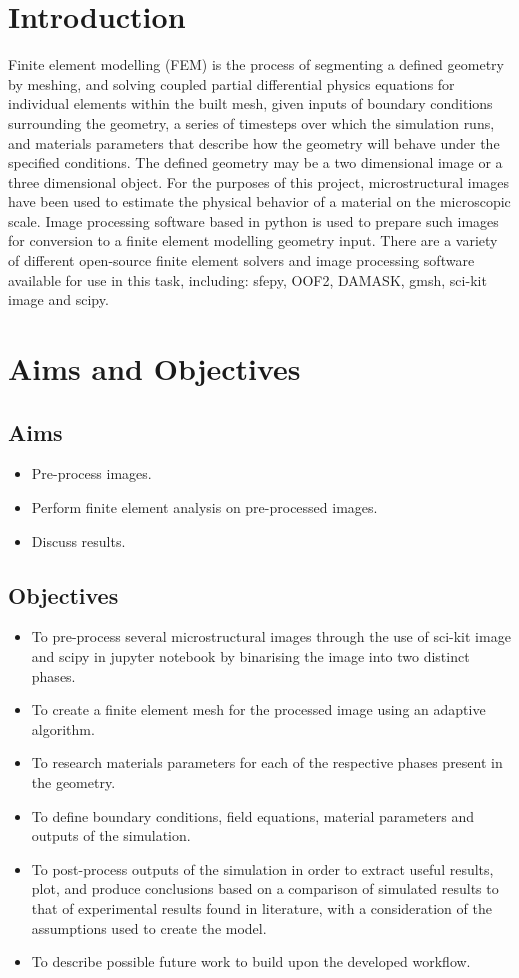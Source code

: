 \documentclass[\report.tex]{subfiles}
\begin{document}
\section{Introduction}
Finite element modelling (FEM) is the process of segmenting a defined geometry by meshing, and solving coupled partial differential physics equations for individual elements within the built mesh, given inputs of boundary conditions surrounding the geometry, a series of timesteps over which the simulation runs, and materials parameters that describe how the geometry will behave under the specified conditions. The defined geometry may be a two dimensional image or a three dimensional object. For the purposes of this project, microstructural images have been used to estimate the physical behavior of a material on the microscopic scale. Image processing software based in python is used to prepare such images for conversion to a finite element modelling geometry input. There are a variety of different open-source finite element solvers and image processing software available for use in this task, including: sfepy, OOF2, DAMASK, gmsh, sci-kit image and scipy.

\section{Aims and Objectives}
\subsection{Aims}

\begin{itemize}
  \item Pre-process images.
  \item Perform finite element analysis on pre-processed images.
  \item Discuss results.
\end{itemize}

\subsection{Objectives}

\begin{itemize}
  \item To pre-process several microstructural images through the use of sci-kit image and scipy in jupyter notebook by binarising the image into two distinct phases.
  \item To create a finite element mesh for the processed image using an adaptive algorithm.
  \item To research materials parameters for each of the respective phases present in the geometry.
  \item To define boundary conditions, field equations, material parameters and outputs of the simulation.
  \item To post-process outputs of the simulation in order to extract useful results, plot, and produce conclusions based on a comparison of simulated results to that of experimental results found in literature, with a consideration of the assumptions used to create the model.
  \item To describe possible future work to build upon the developed workflow.
\end{itemize}
\end{document}
